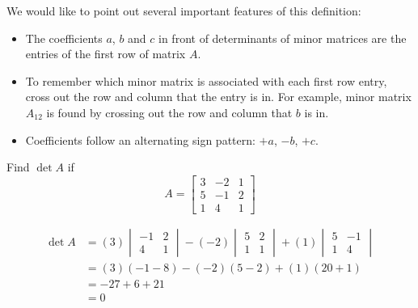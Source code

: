 \documentclass{ximera}
\begin{document}
We would like to point out several important features of this definition:
\begin{itemize}
\item The coefficients $a$, $b$ and $c$ in front of determinants of minor matrices are the entries of the first row of matrix $A$.  
\item To remember which minor matrix is associated with each first row entry, cross out the row and column that the entry is in.  For example, minor matrix $A_{12}$ is found by crossing out the row and column that $b$ is in.
\begin{center}
 \end{center} 
\item Coefficients follow an alternating sign pattern: $+a$, $-b$, $+c$.
\end{itemize}
\begin{example}\label{ex:threebythreedet1}
Find $\det{A}$ if 
$$A=\begin{bmatrix}3&-2&1\\5&-1&2\\1&4&1\end{bmatrix}$$
\begin{explanation}
\begin{align*}
\det{A}&=(3)\begin{vmatrix}-1&2\\4&1\end{vmatrix}-(-2)\begin{vmatrix}5&2\\1&1\end{vmatrix}+(1)\begin{vmatrix}5&-1\\1&4\end{vmatrix}\\
&=(3)(-1-8)-(-2)(5-2)+(1)(20+1)\\
&=-27+6+21\\
&=0
\end{align*}
\end{explanation}
\end{example}
\end{document}
